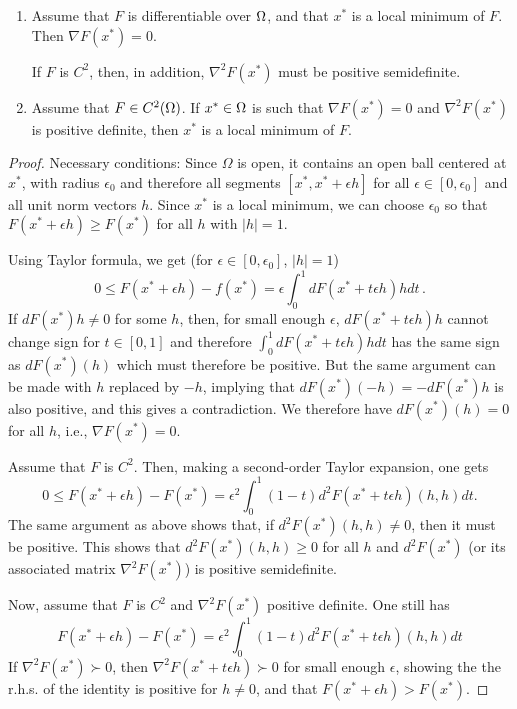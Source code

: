 \begin{theorem}
\label{th:opt.nec}
\begin{enumerate}
\item[{\bf Necessary conditions.}] 
Assume that $F$ is differentiable over $\Omega$, and that $x^*$
is a local minimum of $F$. Then
$\nabla F(x^*) = 0$.

If $F$ is $C^2$, then, in addition, $\nabla^2F(x^*)$ must be positive semidefinite.
\item [{\bf Sufficient conditions.}]
\label{th:opt.suff}
Assume that $F\in C^2(\Omega)$. If $x^*\in \Omega$ is such that $\nabla F(x^*) = 0$
and $\nabla^2F(x^*)$ is positive definite, then $x^*$ is a local minimum of
$F$.
\end{enumerate}
\end{theorem} 

\begin{proof}
Necessary conditions:
Since $\Omega$ is open, it contains an open ball centered at $x^*$, with radius $\epsilon_0$ and therefore all segments $[x^*, x^*+\epsilon h]$ for all $\epsilon\in [0, \epsilon_0]$ and all unit norm vectors $h$. Since $x^*$ is a local minimum, we can choose $\epsilon_0$ so that $F(x^*+\epsilon h) \geq F(x^*)$ for all $h$ with $|h|=1$.

Using Taylor formula, we get (for $\epsilon \in [0, \epsilon_0]$, $|h|=1$)
\[
0\leq F(x^*+\epsilon h) - f(x^*) = \epsilon \int_0^1 dF(x^* + t\epsilon h)h dt\,.
\]
If $dF(x^*)h \neq 0$ for some $h$, then, for small enough $\epsilon$, $dF(x^* + t\epsilon h)h$ cannot change sign for $t\in [0,1]$ and therefore $\int_0^1 dF(x^* + t\epsilon h)h dt$ has the same sign as $dF(x^*)(h)$ which must therefore be positive. But the same argument can be made with $h$ replaced by $-h$, implying that $dF(x^*)(-h) = - dF(x^*)h$ is also positive, and this gives a contradiction. We therefore have $dF(x^*)(h) = 0$ for all $h$, i.e., $\nabla F(x^*) = 0$. 

Assume that $F$ is $C^2$. Then, making a second-order Taylor expansion, one gets
\[
0 \leq F(x^*+\epsilon h) - F(x^*) = \epsilon^2 \int_0^1 (1-t) d^2F(x^* + t\epsilon h)(h, h) dt.
\]
The same argument as above shows that, if $d^2F(x^* )(h, h) \neq 0$, then it must be positive. This shows that $d^2F(x^* )(h, h) \geq 0$ for all $h$ and $d^2F(x^*)$ (or its associated matrix $\nabla^2 F(x^*)$) is positive semidefinite.

Now, assume that $F$ is $C^2$ and $\nabla^2 F(x^*)$ positive definite. One still has
\[
F(x^*+\epsilon h) - F(x^*) = \epsilon^2 \int_0^1 (1-t) d^2F(x^* + t\epsilon h)(h, h) dt
\]
If $\nabla^2F(x^*) \succ 0$, then $\nabla^2F(x^*+t\epsilon h)\succ 0$ for small enough $\epsilon$, showing the the r.h.s. of the identity is positive for $h\neq 0$, and that $F(x^* + \epsilon h) > F(x^*)$.
\end{proof}

